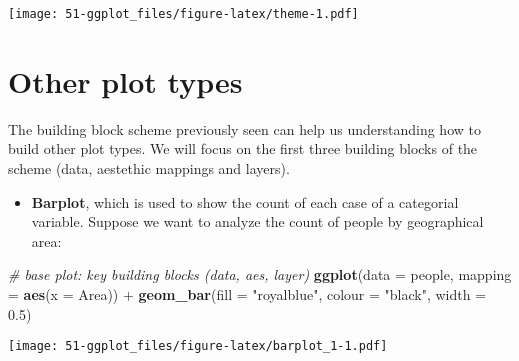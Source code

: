 \documentclass[]{book}
\newenvironment{Shaded}{\begin{snugshade}}{\end{snugshade}}
\newcommand{\KeywordTok}[1]{\textcolor[rgb]{0.13,0.29,0.53}{\textbf{{#1}}}}
\newcommand{\DataTypeTok}[1]{\textcolor[rgb]{0.13,0.29,0.53}{{#1}}}
\newcommand{\FloatTok}[1]{\textcolor[rgb]{0.00,0.00,0.81}{{#1}}}
\newcommand{\StringTok}[1]{\textcolor[rgb]{0.31,0.60,0.02}{{#1}}}
\newcommand{\CommentTok}[1]{\textcolor[rgb]{0.56,0.35,0.01}{\textit{{#1}}}}
\newcommand{\NormalTok}[1]{{#1}}
\providecommand{\tightlist}{%
  \setlength{\itemsep}{0pt}\setlength{\parskip}{0pt}}
\def\tightlist{}
\begin{document}
\texttt{[image: 51-ggplot\_files/figure-latex/theme-1.pdf]}

\clearpage

\section{Other plot types}\label{other-plot-types}

The building block scheme previously seen can help us understanding how
to build other plot types. We will focus on the first three building
blocks of the scheme (data, aestethic mappings and layers).

\begin{itemize}
\tightlist
\item
  \textbf{Barplot}, which is used to show the count of each case of a
  categorial variable. Suppose we want to analyze the count of people by
  geographical area:
\end{itemize}

\begin{Shaded}
\begin{Highlighting}[]
\CommentTok{# base plot: key building blocks (data, aes, layer)}
\KeywordTok{ggplot}\NormalTok{(}\DataTypeTok{data =} \NormalTok{people, }\DataTypeTok{mapping =} \KeywordTok{aes}\NormalTok{(}\DataTypeTok{x =} \NormalTok{Area)) +}\StringTok{ }
\StringTok{  }\KeywordTok{geom_bar}\NormalTok{(}\DataTypeTok{fill =} \StringTok{"royalblue"}\NormalTok{, }\DataTypeTok{colour =} \StringTok{"black"}\NormalTok{, }\DataTypeTok{width =} \FloatTok{0.5}\NormalTok{)}
\end{Highlighting}
\end{Shaded}

\texttt{[image: 51-ggplot\_files/figure-latex/barplot\_1-1.pdf]}

\clearpage
\end{document}
